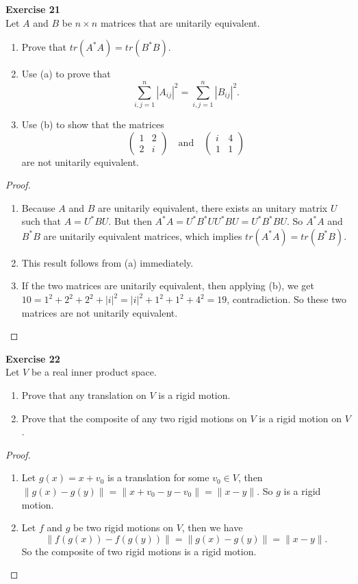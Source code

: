 \documentclass[12pt, a4paper]{article}
\theoremstyle{plain}
\newenvironment{exercise}[2][Exercise]
    { \begin{mdframed}[backgroundcolor=gray!20] \textbf{#1 #2} \\}
    {  \end{mdframed}}
\begin{document}
\begin{exercise}{21}
Let $A$ and $B$ be $n\times n$ matrices that are unitarily equivalent.
\begin{enumerate}[label=(\alph*)]
\item Prove that $tr(A^*A) = tr(B^*B)$.
\item Use (a) to prove that 
\[
\sum_{i,j = 1}^{n}{|A_{ij}|^2} = \sum_{i,j=1}^{n}{|B_{ij}|^2}.
\]
\item Use (b) to show that the matrices 
\[
\begin{pmatrix}
1&2\\
2&i
\end{pmatrix} \quad \text{and} \quad
\begin{pmatrix}
i&4\\
1&1
\end{pmatrix}
\]
are not unitarily equivalent.
\end{enumerate}
\end{exercise}
	\begin{proof}
	\hfill
	\begin{enumerate}[label=(\alph*)]
	\item Because $A$ and $B$ are unitarily equivalent, there exists an unitary matrix $U$ such that $A = U^*BU$. But then $A^*A = U^*B^*UU^*BU = U^*B^*BU$. So $A^*A$ and $B^*B$ are unitarily equivalent matrices, which implies $tr(A^*A)=tr(B^*B)$.
	\item This result follows from (a) immediately.
	\item If the two matrices are unitarily equivalent, then applying (b), we get $10 = 1^2+2^2+2^2+|i|^2 = |i|^2+1^2+1^2+4^2 = 19$, contradiction. So these two matrices are not unitarily equivalent.
	\end{enumerate}
	\end{proof}
	
\begin{exercise}{22}
Let $V$ be a real inner product space.
\begin{enumerate}[label=(\alph*)]
\item Prove that any translation on $V$ is a rigid motion.
\item Prove that the composite of any two rigid motions on $V$ is a rigid motion on $V$.
\end{enumerate}
\end{exercise}
	\begin{proof}
	\hfill
	\begin{enumerate}[label=(\alph*)]
	\item Let $g(x) = x + v_0$ is a translation for some $v_0\in V$, then $\|g(x)-g(y)\| = \|x+v_0-y-v_0\| = \|x-y\|$. So $g$ is a rigid motion.
	\item Let $f$ and $g$ be two rigid motions on $V$, then we have
	\[
	\|f(g(x))-f(g(y))\| = \|g(x)-g(y)\| = \|x-y\|.
	\]
	So the composite of two rigid motions is a rigid motion.
	\end{enumerate}
	\end{proof}
\end{document}
